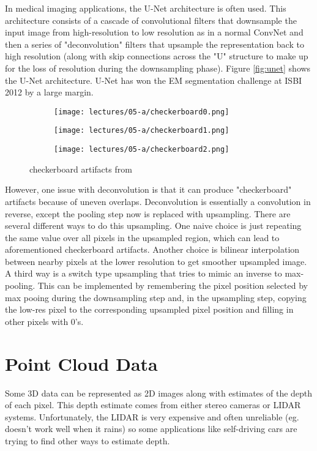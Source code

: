 In medical imaging applications, the U-Net architecture is often used. This architecture consists of a cascade of convolutional filters that downsample the input image from high-resolution to low resolution as in a normal ConvNet and then a series of "deconvolution" filters that upsample the representation back to high resolution (along with skip connections across the "U" structure to make up for the loss of resolution during the downsampling phase). Figure \ref{fig:unet} shows the U-Net architecture. U-Net has won the EM segmentation challenge at ISBI 2012 by a large margin.

\begin{figure}[h]
    \centering
    \begin{subfigure}{0.25\textwidth}
    \texttt{[image: lectures/05-a/checkerboard0.png]} 
    \end{subfigure}
    \begin{subfigure}{0.25\textwidth}
    \texttt{[image: lectures/05-a/checkerboard1.png]}
    \end{subfigure}
    \begin{subfigure}{0.25\textwidth}
    \texttt{[image: lectures/05-a/checkerboard2.png]}
    \end{subfigure}
    \caption{checkerboard artifacts from \citep{odena2016deconvolution}}
    \label{fig:checkerboard}
\end{figure}

However, one issue with deconvolution is that it can produce "checkerboard" artifacts because of uneven overlaps. Deconvolution is essentially a convolution in reverse, except the pooling step now is replaced with upsampling. There are several different ways to do this upsampling. One naive choice is just repeating the same value over all pixels in the upsampled region, which can lead to aforementioned checkerboard artifacts. Another choice is bilinear interpolation between nearby pixels at the lower resolution to get smoother upsampled image. A third way is a switch type upsampling that tries to mimic an inverse to max-pooling. This can be implemented by remembering the pixel position selected by max pooing during the downsampling step and, in the upsampling step, copying the low-res pixel to the corresponding upsampled pixel position and filling in other pixels with 0's.
\section{Point Cloud Data}
Some 3D data can be represented as 2D images along with estimates of the depth of each pixel. This depth estimate comes from either stereo cameras or LIDAR systems. Unfortunately, the LIDAR is very expensive and often unreliable (eg. doesn't work well when it rains) so some applications like self-driving cars are trying to find other ways to estimate depth.

